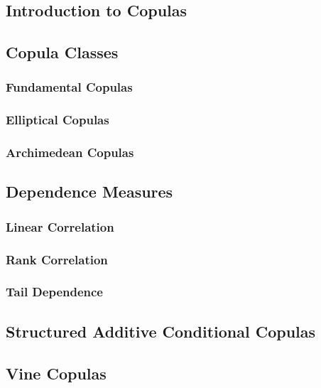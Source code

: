 \documentclass[11pt, twoside]{article}
\numberwithin{equation}{section}
\numberwithin{table}{section}
\numberwithin{figure}{section}
\begin{document}
\subsection{Introduction to Copulas} \label{ssec:intro_to_copulas}

\subsection{Copula Classes} \label{ssec:copula_classes}

\subsubsection{Fundamental Copulas} \label{sssec:fundamental_copulas}

\subsubsection{Elliptical Copulas} \label{sssec:elliptical_copulas}

\subsubsection{Archimedean Copulas} \label{sssec:archimedean_copulas}

\subsection{Dependence Measures} \label{ssec:dependence_measures}

\subsubsection{Linear Correlation} \label{sssec:linear_correlation}

\subsubsection{Rank Correlation} \label{sssec:rank_correlation}

\subsubsection{Tail Dependence} \label{sssec:tail_dependence}

\subsection{Structured Additive Conditional Copulas} \label{ssec:conditional_copulas}

\subsection{Vine Copulas} \label{ssec:vine_copulas}

\newpage
\thispagestyle{empty}
\cleardoublepage
\end{document}
